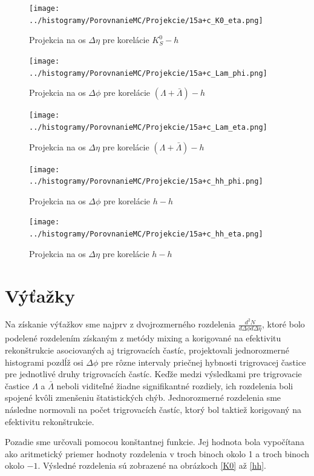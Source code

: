 \documentclass[thesismargins, thesislinespacing]{rnthesis}
\begin{document}
\begin{figure}
	\centering
	\texttt{[image: ../histogramy/PorovnanieMC/Projekcie/15a+c\_K0\_eta.png]}
	\caption{Projekcia na os $\Delta \eta$ pre korelácie $K^0_S - h$}
	\label{K0eta}
\end{figure}
\begin{figure}
\centering
\texttt{[image: ../histogramy/PorovnanieMC/Projekcie/15a+c\_Lam\_phi.png]}
\caption{Projekcia na os $\Delta \phi$ pre korelácie $(\Lambda + \bar{\Lambda})- h$}
\label{Lamphi}
\end{figure}
\begin{figure}
	\centering
	\texttt{[image: ../histogramy/PorovnanieMC/Projekcie/15a+c\_Lam\_eta.png]}
	\caption{Projekcia na os $\Delta \eta$ pre korelácie $(\Lambda + \bar{\Lambda})- h$}
	\label{Lameta}
\end{figure}

\begin{figure}
	\centering
	\texttt{[image: ../histogramy/PorovnanieMC/Projekcie/15a+c\_hh\_phi.png]}
	\caption{Projekcia na os $\Delta \phi$ pre korelácie $h - h$}
	\label{hphi}
\end{figure}

\begin{figure}
	\centering
	\texttt{[image: ../histogramy/PorovnanieMC/Projekcie/15a+c\_hh\_eta.png]}
	\caption{Projekcia na os $\Delta \eta$ pre korelácie $h - h$}
	\label{heta}
\end{figure}



\section{Výťažky}

Na získanie výťažkov sme najprv z dvojrozmerného rozdelenia $\frac{d^2N}{d\Delta \phi d\Delta \eta}$, ktoré bolo podelené rozdelením získaným z metódy mixing a korigované na efektivitu rekonštrukcie asociovaných aj trigrovacích častíc, projektovali jednorozmerné histogra\-mi pozdĺž osi $\Delta\phi$ pre rôzne intervaly priečnej hybnosti trigrovacej častice pre jednotlivé druhy trigrovacích častíc. Keďže medzi  výsledkami pre trigrovacie častice $\Lambda$ a $\bar{\Lambda}$ neboli viditeľné žiadne signifikantné rozdiely, ich rozdelenia boli spojené kvôli zmenšeniu štatistických chýb. Jednorozmerné rozdelenia sme následne normovali na počet trigrovacích častíc, ktorý bol taktiež korigovaný na efektivitu rekonštrukcie. 

Pozadie sme určovali pomocou konštantnej funkcie. Jej hodnota bola vypočítana ako aritmetický priemer hodnoty rozdelenia v troch binoch okolo 1 a troch binoch okolo $-1$. Výsledné rozdelenia sú zobrazené na obrázkoch \ref{K0} až \ref{hh}. 
\end{document}
